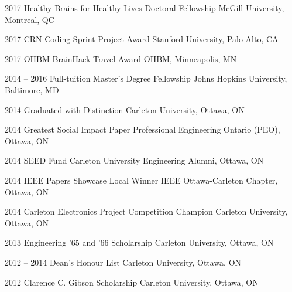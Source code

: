 \documentclass[]{friggeri-cv} %
\begin{document}
\begin{entrylist}
\vspace{-7pt}

\entry
{2017}
{Healthy Brains for Healthy Lives Doctoral Fellowship}
{McGill University, Montreal, QC}
{}
\vspace{-7pt}

\entry
{2017}
{CRN Coding Sprint Project Award}
{Stanford University, Palo Alto, CA}
{}
\vspace{-7pt}

\entry
{2017}
{OHBM BrainHack Travel Award}
{OHBM, Minneapolis, MN}
{}
\vspace{-7pt}

\entry
{2014 -- 2016}
{Full-tuition Master's Degree Fellowship}
{Johns Hopkins University, Baltimore, MD}
{}
\vspace{-7pt}

\entry
{2014}
{Graduated with Distinction}
{Carleton University, Ottawa, ON}
{}
\vspace{-7pt}

\entry
{2014}
{Greatest Social Impact Paper}
{Professional Engineering Ontario (PEO), Ottawa, ON}
{}
\vspace{-7pt}

\entry
{2014}
{SEED Fund}
{Carleton University Engineering Alumni, Ottawa, ON}
{}
\vspace{-7pt}

\entry
{2014}
{IEEE Papers Showcase Local Winner}
{IEEE Ottawa-Carleton Chapter, Ottawa, ON}
{}
\vspace{-7pt}

\entry
{2014}
{Carleton Electronics Project Competition Champion}
{Carleton University, Ottawa, ON}
{}
\vspace{-7pt}

\entry
{2013}
{Engineering '65 and '66 Scholarship}
{Carleton University, Ottawa, ON}
{}
\vspace{-7pt}

\entry
{2012 -- 2014}
{Dean's Honour List}
{Carleton University, Ottawa, ON}
{}
\vspace{-7pt}

\entry
{2012}
{Clarence C. Gibson Scholarship}
{Carleton University, Ottawa, ON}
{}
\vspace{-7pt}
\end{entrylist}
\end{document}
